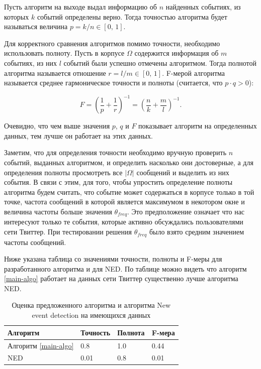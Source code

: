 \documentclass[12pt, a4paper]{article}
\begin{document}
	Пусть алгоритм на выходе выдал информацию об $n$ найденных событиях, из которых $k$ событий определены верно. Тогда точностью алгоритма будет называться величина $p = k/n \in [0,\, 1]$. 
	
	Для корректного сравнения алгоритмов помимо точности, необходимо использовать полноту. Пусть в корпусе $\Omega$ содержится информация об $m$ событиях, из них $l$ событий были успешно отмечены алгоритмом. Тогда полнотой алгоритма называется отношение $r = l/m \in [0,\, 1]$. F-мерой алгоритма называется среднее гармоническое точности и полноты (считается, что $p \cdot q > 0$):
	
	\begin{equation}
	F = \left(\frac{1}{p} + \frac{1}{r}\right)^{-1} = \left( \frac{n}{k} + \frac{m}{l} \right)^{-1}.
	\end{equation}
	
	Очевидно, что чем выше значения $p$, $q$ и $F$ показывает алгоритм на определенных данных, тем лучше он работает на этих данных.
	
	Заметим, что для определения точности необходимо вручную проверить $n$ событий, выданных алгоритмом, и определить насколько они достоверные, а для определения полноты просмотреть все $\vert \Omega \vert$ сообщений и выделить из них события. В связи с этим, для того, чтобы упростить определение полноты алгоритма будем считать, что событие может содержаться в корпусе только в той точке, частота сообщений в которой является максимумом в некотором окне и величина частоты больше значения $\theta_{freq}$. Это предположение означает что нас интересуют только те события, которые активно обсуждались пользователями сети Твиттер. При тестировании решения $\theta_{freq}$ было взято средним значением частоты сообщений.
	
	Ниже указана таблица со значениями точности, полноты и F-меры для разработанного алгоритма и для NED. По таблице можно видеть что алгоритм \ref{main-algo} работает на данных сети Твиттер существенно лучше алгоритма NED.
	
	\begin{table}[h]
	\centering
	\caption{Оценка предложенного алгоритма и алгоритма New event detection на имеющихся данных}
	\begin{tabular}{ l l l l}
	Алгоритм & Точность & Полнота & F-мера \\ \hline
	Алгоритм \ref{main-algo} & 0.8 & 1.0 & 0.44 \\ 
	NED & 0.01 & 0.8 & 0.01 \\ 
	\end{tabular}
	\end{table}
	
\end{document}
